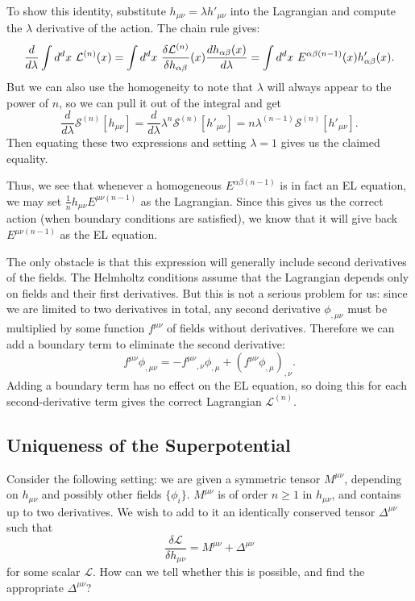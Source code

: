 \documentclass[aps,physrev,preprint,groupedaddress]{revtex4-2}
\begin{document}
To show this identity, substitute \(h_{\mu\nu}=\lambda h'_{\mu\nu}\) into the Lagrangian and compute the \(\lambda\) derivative of the action. The chain rule gives:
\begin{equation}
\frac{d}{d\lambda}\intop d^dx\ \mathcal{L}^{(n)}(x)=\intop d^dx\ \frac{\delta\mathcal{L}^{(n)}}{\delta h_{\alpha\beta}}(x)\frac{dh_{\alpha\beta}(x)}{d\lambda}=\intop d^dx\ E^{\alpha\beta(n-1)}(x)h'_{\alpha\beta}(x).
\end{equation}
But we can also use the homogeneity to note that \(\lambda\) will always appear to the power of \(n\), so we can pull it out of the integral and get 
\begin{equation}
\frac{d}{d\lambda}\mathcal{S}^{(n)}[h_{\mu\nu}]=\frac{d}{d\lambda}\lambda^n\mathcal{S}^{(n)}[h'_{\mu\nu}]=n\lambda^{(n-1)}\mathcal{S}^{(n)}[h'_{\mu\nu}].
\end{equation}
Then equating these two expressions and setting \(\lambda=1\) gives us the claimed equality.

Thus, we see that whenever a homogeneous \(E^{\alpha\beta(n-1)}\) is in fact an EL equation, we may set \(\frac{1}{n}h_{\mu\nu}E^{\mu\nu(n-1)}\) as the Lagrangian. Since this gives us the correct action (when boundary conditions are satisfied), we know that it will give back \(E^{\mu\nu(n-1)}\) as the EL equation. 

The only obstacle is that this expression will generally include second derivatives of the fields. The Helmholtz conditions assume that the Lagrangian depends only on fields and their first derivatives. But this is not a serious problem for us: since we are limited to two derivatives in total, any second derivative \(\phi_{,\mu\nu}\) must be multiplied by some function \(f^{\mu\nu}\) of fields without derivatives. Therefore we can add a boundary term to eliminate the second derivative:
\begin{equation}
f^{\mu\nu}\phi_{,\mu\nu}=-f^{\mu\nu}{}_{,\nu}\phi_{,\mu}+{(f^{\mu\nu}\phi_{,\mu})}_{,\nu}.
\end{equation}
Adding a boundary term has no effect on the EL equation, so doing this for each second-derivative term gives the correct Lagrangian \(\mathcal{L}^{(n)}\). 
\subsection{Uniqueness of the Superpotential}
Consider the following setting: we are given a symmetric tensor \(M^{\mu\nu}\), depending on \(h_{\mu\nu}\)  and possibly other fields \(\{\phi_i\}\).  \(M^{\mu\nu}\) is of order \(n\ge1\) in \(h_{\mu\nu}\), and contains up to two derivatives. We wish to add to it an identically conserved tensor \(\Delta^{\mu\nu}\) such that \begin{equation} \frac{\delta\mathcal{L}}{\delta h_{\mu\nu}}=M^{\mu\nu}+\Delta^{\mu\nu}\end{equation}
for some scalar \(\mathcal{L}\). How can we tell whether this is possible, and find the appropriate \(\Delta^{\mu\nu}\)?
\end{document}
